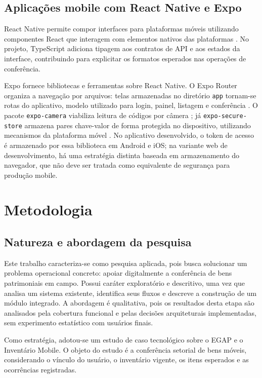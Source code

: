 \documentclass[12pt,a4paper]{article}
\begin{document}
\subsection{Aplicações mobile com React Native e Expo}

React Native permite compor interfaces para plataformas móveis utilizando
componentes React que interagem com elementos nativos das plataformas
\cite{reactnativeDocs}. No projeto, TypeScript adiciona tipagem aos contratos
de API e aos estados da interface, contribuindo para explicitar os formatos
esperados nas operações de conferência.

Expo fornece bibliotecas e ferramentas sobre React Native. O Expo Router
organiza a navegação por arquivos: telas armazenadas no diretório
\texttt{app} tornam-se rotas do aplicativo, modelo utilizado para login,
painel, listagem e conferência \cite{expoRouter}. O pacote
\texttt{expo-camera} viabiliza leitura de códigos por câmera
\cite{expoCamera}; já \texttt{expo-secure-store} armazena pares chave-valor de
forma protegida no dispositivo, utilizando mecanismos da plataforma móvel
\cite{expoSecureStore}. No aplicativo desenvolvido, o token de acesso é
armazenado por essa biblioteca em Android e iOS; na variante web de
desenvolvimento, há uma estratégia distinta baseada em armazenamento do
navegador, que não deve ser tratada como equivalente de segurança para
produção mobile.

\section{Metodologia}

\subsection{Natureza e abordagem da pesquisa}

Este trabalho caracteriza-se como pesquisa aplicada, pois busca solucionar um
problema operacional concreto: apoiar digitalmente a conferência de bens
patrimoniais em campo. Possui caráter exploratório e descritivo, uma vez que
analisa um sistema existente, identifica seus fluxos e descreve a construção de
um módulo integrado. A abordagem é qualitativa, pois os resultados desta etapa
são analisados pela cobertura funcional e pelas decisões arquiteturais
implementadas, sem experimento estatístico com usuários finais.

Como estratégia, adotou-se um estudo de caso tecnológico sobre o EGAP e o
Inventário Mobile. O objeto do estudo é a conferência setorial de bens móveis,
considerando o vínculo do usuário, o inventário vigente, os itens esperados e
as ocorrências registradas.
\end{document}

